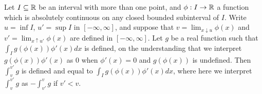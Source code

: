 Let $I\subseteq\Bbb R$ be an interval with more
than one point, and $\phi:I\to\Bbb R$ a function which is absolutely
continuous on any closed bounded subinterval of $I$.   Write $u=\inf I$,
$u'=\sup I$ in
$[-\infty,\infty]$, and suppose that $v=\lim_{x\downarrow u}\phi(x)$ and
$v'=\lim_{x\uparrow u'}\phi(x)$ are defined in $[-\infty,\infty]$.   Let
$g$ be a real function such that
$\int_Ig(\phi(x))\phi'(x)dx$ is defined,
on the understanding that we interpret $g(\phi(x))\phi'(x)$ as $0$ when
$\phi'(x)=0$ and $g(\phi(x))$ is undefined.   Then
$\int_v^{v'}g$ is defined and equal to $\int_Ig(\phi(x))\phi'(x)dx$, where
here we interpret $\int_v^{v'}g$ as $-\int_{v'}^vg$ if
$v'<v$.

